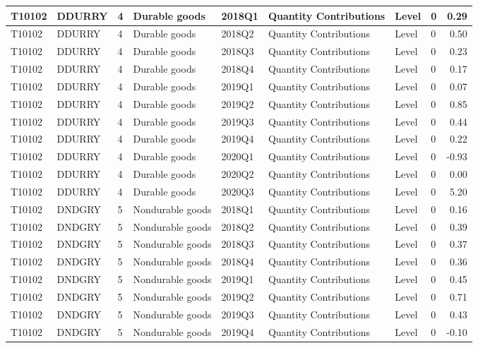 \documentclass[
]{article}
\begin{document}
\begin{tabular}{l|l|l|l|l|l|l|l|r}
\hline
T10102 & DDURRY & 4 & Durable goods & 2018Q1 & Quantity Contributions & Level & 0 & 0.29\\
\hline
T10102 & DDURRY & 4 & Durable goods & 2018Q2 & Quantity Contributions & Level & 0 & 0.50\\
\hline
T10102 & DDURRY & 4 & Durable goods & 2018Q3 & Quantity Contributions & Level & 0 & 0.23\\
\hline
T10102 & DDURRY & 4 & Durable goods & 2018Q4 & Quantity Contributions & Level & 0 & 0.17\\
\hline
T10102 & DDURRY & 4 & Durable goods & 2019Q1 & Quantity Contributions & Level & 0 & 0.07\\
\hline
T10102 & DDURRY & 4 & Durable goods & 2019Q2 & Quantity Contributions & Level & 0 & 0.85\\
\hline
T10102 & DDURRY & 4 & Durable goods & 2019Q3 & Quantity Contributions & Level & 0 & 0.44\\
\hline
T10102 & DDURRY & 4 & Durable goods & 2019Q4 & Quantity Contributions & Level & 0 & 0.22\\
\hline
T10102 & DDURRY & 4 & Durable goods & 2020Q1 & Quantity Contributions & Level & 0 & -0.93\\
\hline
T10102 & DDURRY & 4 & Durable goods & 2020Q2 & Quantity Contributions & Level & 0 & 0.00\\
\hline
T10102 & DDURRY & 4 & Durable goods & 2020Q3 & Quantity Contributions & Level & 0 & 5.20\\
\hline
T10102 & DNDGRY & 5 & Nondurable goods & 2018Q1 & Quantity Contributions & Level & 0 & 0.16\\
\hline
T10102 & DNDGRY & 5 & Nondurable goods & 2018Q2 & Quantity Contributions & Level & 0 & 0.39\\
\hline
T10102 & DNDGRY & 5 & Nondurable goods & 2018Q3 & Quantity Contributions & Level & 0 & 0.37\\
\hline
T10102 & DNDGRY & 5 & Nondurable goods & 2018Q4 & Quantity Contributions & Level & 0 & 0.36\\
\hline
T10102 & DNDGRY & 5 & Nondurable goods & 2019Q1 & Quantity Contributions & Level & 0 & 0.45\\
\hline
T10102 & DNDGRY & 5 & Nondurable goods & 2019Q2 & Quantity Contributions & Level & 0 & 0.71\\
\hline
T10102 & DNDGRY & 5 & Nondurable goods & 2019Q3 & Quantity Contributions & Level & 0 & 0.43\\
\hline
T10102 & DNDGRY & 5 & Nondurable goods & 2019Q4 & Quantity Contributions & Level & 0 & -0.10\\

\end{tabular}
\end{document}

